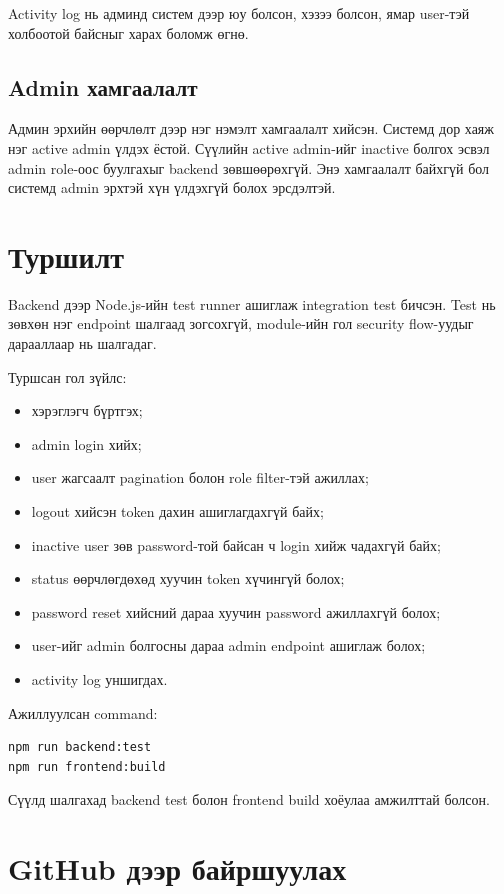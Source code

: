 \documentclass[12pt,a4paper]{article}
\begin{document}
Activity log нь админд систем дээр юу болсон, хэзээ болсон, ямар user-тэй холбоотой байсныг харах боломж өгнө.

\subsection{Admin хамгаалалт}

Админ эрхийн өөрчлөлт дээр нэг нэмэлт хамгаалалт хийсэн. Системд дор хаяж нэг active admin үлдэх ёстой. Сүүлийн active admin-ийг inactive болгох эсвэл admin role-оос буулгахыг backend зөвшөөрөхгүй. Энэ хамгаалалт байхгүй бол системд admin эрхтэй хүн үлдэхгүй болох эрсдэлтэй.

\section{Туршилт}

Backend дээр Node.js-ийн test runner ашиглаж integration test бичсэн. Test нь зөвхөн нэг endpoint шалгаад зогсохгүй, module-ийн гол security flow-уудыг дарааллаар нь шалгадаг.

Туршсан гол зүйлс:

\begin{itemize}
  \item хэрэглэгч бүртгэх;
  \item admin login хийх;
  \item user жагсаалт pagination болон role filter-тэй ажиллах;
  \item logout хийсэн token дахин ашиглагдахгүй байх;
  \item inactive user зөв password-той байсан ч login хийж чадахгүй байх;
  \item status өөрчлөгдөхөд хуучин token хүчингүй болох;
  \item password reset хийсний дараа хуучин password ажиллахгүй болох;
  \item user-ийг admin болгосны дараа admin endpoint ашиглаж болох;
  \item activity log уншигдах.
\end{itemize}

Ажиллуулсан command:

\begin{lstlisting}[style=api]
npm run backend:test
npm run frontend:build
\end{lstlisting}

Сүүлд шалгахад backend test болон frontend build хоёулаа амжилттай болсон.

\section{GitHub дээр байршуулах}
\end{document}
